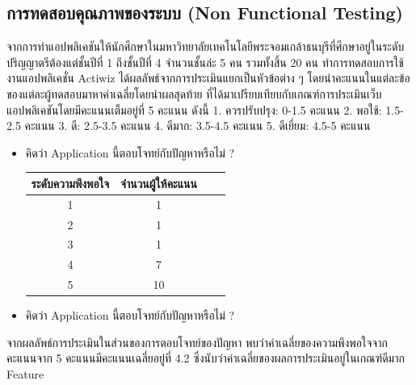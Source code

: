\documentclass[14pt,oneside,openright,a4paper]{cpe-thai-project}
\begin{document}
\subsection{การทดสอบคุณภาพของระบบ (Non Functional Testing)}
จากการทําแอปพลิเคชันให้นักศึกษาในมหาวิทยาลัยเทคโนโลยีพระจอมเกล้าธนบุรีที่ศึกษาอยู่ในระดับปริญญาตรีต้องแต่ชั้นปีที่ 1 ถึงชั้นปีที่ 4 จำนวนชั้นล่ะ 5 คน รวมทั้งสิ้น 20 คน ทำการทดสอบการใช้งานแอปพลิเคชั่น Actiwiz ได้ผลลัพธ์จากการประเมินแยกเป็นหัวข้อต่าง ๆ โดยนําคะแนนในแต่ละข้อของแต่ละผู้ทดสอบมาหาค่าเฉลี่ยโดยนําผลสุดท้าย
ที่ได้มาเปรียบเทียบกับเกณฑ์การประเมินเว็บแอปพลิเคชันโดยมีคะแนนเต็มอยู่ที่ 5 คะแนน ดังนี้
1. ควรปรับปรุง: 0-1.5 คะแนน
2. พอใช้: 1.5-2.5 คะแนน
3. ดี: 2.5-3.5 คะแนน
4. ดีมาก: 3.5-4.5 คะแนน
5. ดีเยี่ยม: 4.5-5 คะแนน
\begin{itemize}
  \item คิดว่า Application นี้ตอบโจทย์กับปัญหาหรือไม่ ?
  \begin{table}[!h]
    \centering
    \captionsetup{justification=centering} %
    \begin{tabular}{|c|c|c|c|}
      \hline
      \multicolumn{1}{|c|}{\cellcolor[HTML]{9FC5E8}ระดับความพึงพอใจ} &
        \multicolumn{1}{c|}{\cellcolor[HTML]{9FC5E8}จำนวนผู้ให้คะแนน} \\ \hline
       1 & 1
         \\ \hline 
       2 & 1
         \\ \hline 
       3 & 1
         \\ \hline 
       4 & 7
         \\ \hline 
       5 & 10
         \\ \hline
    \end{tabular}
    \label{tab:Problemssolvingsatisfaction}
  \end{table}
  \item คิดว่า Application นี้ตอบโจทย์กับปัญหาหรือไม่ ?
\end{itemize}
จากผลลัพธ์การประเมินในส่วนของการตอบโจทย์ของปัญหา พบว่าค่าเฉลี่ยของความพึงพอใจจากคะแนนจาก 5 คะแนนมีคะแนนเฉลี่ยอยู่ที่ 4.2 ซึ่งนับว่าค่าเฉลี่ยของผลการประเมินอยู่ในเกณฑ์ดีมาก
  Feature
\end{document}
